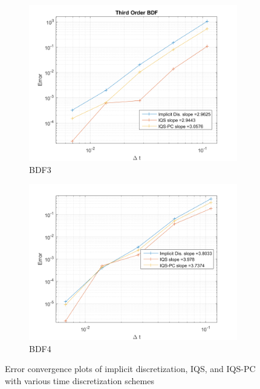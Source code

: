 \documentclass{elsarticle}
\newcommand{\iqspc}{IQS-PC\xspace}
\begin{document}
\begin{figure}[!htbp]
\begin{subfigure}[b]{0.49\textwidth}
\includegraphics[width=\linewidth]{figures/1D_conv_BDF3.png}
\caption{BDF3}
\end{subfigure}
\begin{subfigure}[b]{0.49\textwidth}
\centering
\includegraphics[width=\linewidth]{figures/1D_conv_BDF4.png}
\caption{BDF4}
\end{subfigure}
\caption{Error convergence plots of implicit discretization, IQS, and \iqspc with various time discretization schemes}
\label{fig:1D_conv}
\end{figure}
\end{document}
